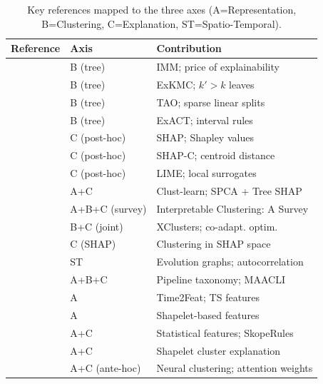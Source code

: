 \documentclass{article}
\theoremstyle{plain}
\theoremstyle{definition}
\theoremstyle{remark}
\begin{document}
\begin{table}[h]
\centering
\footnotesize
\setlength{\tabcolsep}{3pt}
\begin{tabular}{p{2.6cm} p{1.6cm} p{3.4cm}}
\toprule
\textbf{Reference} & \textbf{Axis} & \textbf{Contribution} \\
\midrule
\citet{dasgupta_explainable_nodate} & B (tree) & IMM; price of explainability \\
\citet{frost_exkmc_2020} & B (tree) & ExKMC; $k' > k$ leaves \\
\citet{gabidolla_optimal_2022} & B (tree) & TAO; sparse linear splits \\
\citet{sabbatini_exact_nodate} & B (tree) & ExACT; interval rules \\
\citet{lundberg_unified_2017} & C (post-hoc) & SHAP; Shapley values \\
\citet{cohen_shapley-based_2024} & C (post-hoc) & SHAP-C; centroid distance \\
\citet{ribeiro_why_2016-1} & C (post-hoc) & LIME; local surrogates \\
\citet{alvarez-garcia_comprehensive_2024} & A+C & Clust-learn; SPCA + Tree SHAP \\
\citet{hu_interpretable_2025} & A+B+C (survey) & Interpretable Clustering: A Survey \\
\citet{hwang_xclusters_2023} & B+C (joint) & XClusters; co-adapt. optim. \\
\citet{hwang_xclusters_2023} & C (SHAP) & Clustering in SHAP space \\
\citet{hamdi_spatiotemporal_2022} & ST & Evolution graphs; autocorrelation \\
\citet{portugal_framework_2024} & A+B+C & Pipeline taxonomy; MAACLI \\
\citet{bonifati_time2feat_2022} & A & Time2Feat; TS features \\
\citet{ye_time_2009} & A & Shapelet-based features \\
\citet{cohen_shapley-based_2024} & A+C & Statistical features; SkopeRules \\
\citet{elamouri_constrained_2023} & A+C & Shapelet cluster explanation \\
\citet{peng_xai_2022} & A+C (ante-hoc) & Neural clustering; attention weights \\
\bottomrule
\end{tabular}
\caption{Key references mapped to the three axes (A=Representation, B=Clustering, C=Explanation, ST=Spatio-Temporal).}
\label{tab:litreview}
\vspace{-1.5em}
\end{table}
\end{document}
